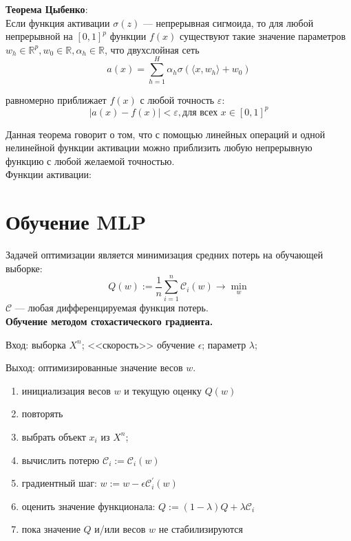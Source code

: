 \documentclass[11pt, oneside]{article}   	%
\begin{document}
	
	\textbf{Теорема Цыбенко}: \\
		Если функция активации $\sigma(z)$ --- непрерывная сигмоида, то для любой непрерывной на $[0, 1]^p$ функции $f(x)$ существуют такие значение параметров $w_h \in \mathbb{R}^p, w_0 \in \mathbb{R}, \alpha_h \in \mathbb{R} $, что двухслойная сеть 
		$$ a(x) = \sum\limits_{h=1}^H \alpha_h \sigma( \langle x, w_h \rangle + w_0) $$
		
		равномерно приближает $f(x)$ с любой точность $\varepsilon$:
		$$ |a(x) - f(x)| < \varepsilon, \text{для всех } x \in [0, 1]^p $$
	
	Данная теорема говорит о том, что с помощью линейных операций и одной нелинейной функции активации можно приблизить любую непрерывную функцию с любой желаемой точностью.\\
	
	\newpage
	Функции активации:
	\begin{figure}[h]
	\end{figure}
	
	\section{Обучение MLP}
	Задачей оптимизации является минимизация средних потерь на обучающей выборке:
	$$ Q(w) := \dfrac{1}{n} \sum\limits_{i=1}^{n} \mathcal{C}_i(w) \rightarrow \min\limits_w  $$
	$\mathcal{C}$ --- любая дифференцируемая функция потерь. \\
	
	\textbf{Обучение методом стохастического градиента.}
	
	Вход: выборка $X^n$; <<скорость>> обучение $\epsilon$; параметр $\lambda$;
	
	Выход: оптимизированные значение весов $w$.
	
	\begin{enumerate}
		\item инициализация весов $w$ и текущую оценку $Q(w)$
		\item повторять
		\item выбрать объект $x_i$ из $X^n$;
		\item вычислить потерю $\mathcal{C}_i := \mathcal{C}_i(w)$
		\item градиентный шаг: $w := w - \epsilon \mathcal{C}_i^{'}(w)$
		\item оценить значение функционала: $Q := (1-\lambda)Q + \lambda \mathcal{C}_i$
		\item пока значение $Q$ и/или весов $w$ не стабилизируются
	\end{enumerate}	
\end{document}
